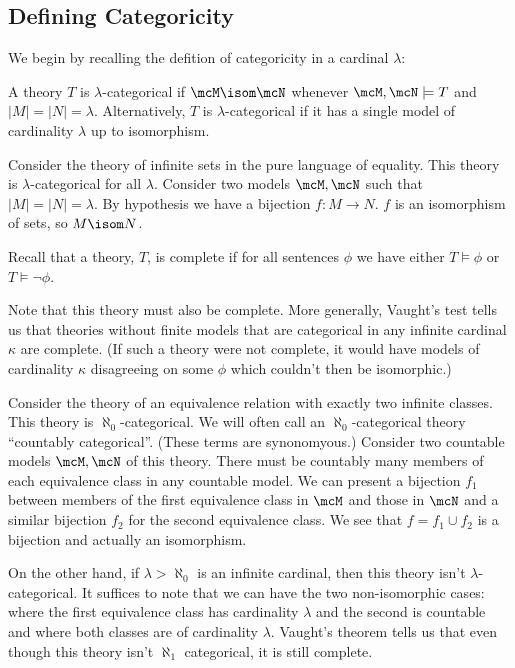 \subsection{Defining Categoricity}

We begin by recalling the defition of categoricity in a cardinal \(\lambda\):

\begin{definition}\label{def_categoricity}
A theory \(T\) is \(\lambda\)-categorical if \(\mcM \isom \mcN\) whenever \(\mcM, \mcN \models T\) and \(|M| = |N| = \lambda\).
Alternatively, \(T\) is \(\lambda\)-categorical if it has a single model of cardinality \(\lambda\) up to isomorphism. 
\end{definition}

\begin{example}\label{example_categoricity_sets}
Consider the theory of infinite sets in the pure language of equality. 
This theory is \(\lambda\)-categorical for all \(\lambda\).
Consider two models \(\mcM, \mcN\) such that \(|M|=|N|=\lambda\). 
By hypothesis we have a bijection \(f: M \to N\). 
\(f\) is an isomorphism of sets, so \(M \isom N\).
\end{example}

\begin{definition}
Recall that a theory, \(T\), is complete if for all sentences \(\phi\) we have either \(T \models \phi\) or \(T \models \neg \phi\). 
\end{definition}

Note that this theory must also be complete. 
More generally, Vaught's test tells us that theories without finite models that are categorical in any infinite cardinal \(\kappa\) are complete. 
(If such a theory were not complete, it would have models of cardinality \(\kappa\) disagreeing on some \(\phi\) which couldn't then be isomorphic.)

\begin{example}\label{example_categoricity_equiv}
Consider the theory of an equivalence relation with exactly two infinite classes. 
This theory is \(\aleph_0\)-categorical.
We will often call an \(\aleph_0\)-categorical theory ``countably categorical''.
(These terms are synonomyous.)  
Consider two countable models \(\mcM, \mcN\) of this theory. 
There must be countably many members of each equivalence class in any countable model. 
We can present a bijection \(f_1\) between members of the first equivalence class in  \(\mcM\) and those in \(\mcN\) and a similar bijection \(f_2\) for the second equivalence class. 
We see that \(f = f_1 \cup f_2\) is a bijection and actually an isomorphism. 

On the other hand, if \(\lambda > \aleph_0\) is an infinite cardinal, then this theory isn't \(\lambda\)-categorical. 
It suffices to note that we can have the two non-isomorphic cases: where the first equivalence class has cardinality \(\lambda\) and the second is countable and where both classes are of cardinality \(\lambda\). 
Vaught's theorem tells us that even though this theory isn't \(\aleph_1\) categorical, it is still complete. 
\end{example}

